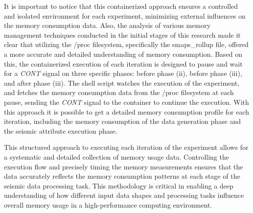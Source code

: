 It is important to notice that this containerized approach ensures a controlled and isolated environment for each experiment, minimizing external influences on the memory consumption data.
Also, the analysis of various memory management techniques conducted in the initial stages of this research made it clear that utilizing the /proc filesystem, specifically the smaps\_rollup file, offered a more accurate and detailed understanding of memory consumption.
Based on this, the containerized execution of each iteration is designed to pause and wait for a \textit{CONT} signal on three specific phases: before phase (ii), before phase (iii), and after phase (iii).
The shell script watches the execution of the experiment, and fetches the memory consumption data from the /proc filesystem at each pause, sending the \textit{CONT} signal to the container to continue the execution.
With this approach it is possible to get a detailed memory consumption profile for each iteration, including the memory consumption of the data generation phase and the seismic attribute execution phase.

This structured approach to executing each iteration of the experiment allows for a systematic and detailed collection of memory usage data.
Controlling the execution flow and precisely timing the memory measurements ensures that the data accurately reflects the memory consumption patterns at each stage of the seismic data processing task.
This methodology is critical in enabling a deep understanding of how different input data shapes and processing tasks influence overall memory usage in a high-performance computing environment.
